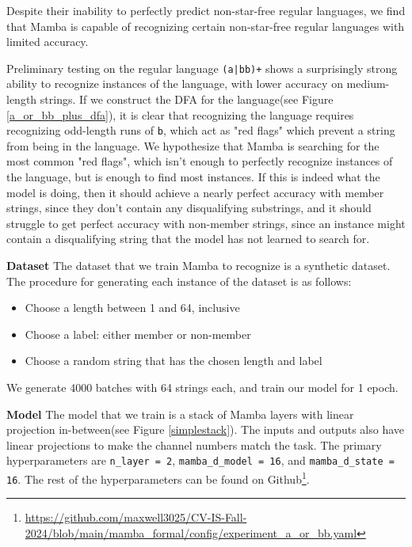 Despite their inability to perfectly predict non-star-free regular languages,
we find that Mamba is capable of recognizing certain non-star-free regular
languages with limited accuracy.

Preliminary testing on the regular language \texttt{(a|bb)+} shows a
surprisingly strong ability to recognize instances of the language, with lower
accuracy on medium-length strings.
If we construct the DFA for the language(see Figure \ref{a_or_bb_plus_dfa}), it
is clear that recognizing the language requires recognizing odd-length runs of
\verb|b|, which act as "red flags" which prevent a string from being in the
language.
We hypothesize that Mamba is searching for the most common "red flags", which
isn't enough to perfectly recognize instances of the language, but is enough
to find most instances.
If this is indeed what the model is doing, then it should achieve a nearly
perfect accuracy with member strings, since they don't contain any disqualifying
substrings, and it should struggle to get perfect accuracy with non-member
strings, since an instance might contain a disqualifying string that the model
has not learned to search for.

\textbf{Dataset} The dataset that we train Mamba to recognize is a synthetic
dataset.
The procedure for generating each instance of the dataset is as follows:
\begin{itemize}
    \item Choose a length between 1 and 64, inclusive
    \item Choose a label: either member or non-member
    \item Choose a random string that has the chosen length and label
\end{itemize}
We generate 4000 batches with 64 strings each, and train our model for 1 epoch.

\textbf{Model} The model that we train is a stack of Mamba layers with linear
projection in-between(see Figure \ref{simplestack}).
The inputs and outputs also have linear projections to make the channel numbers
match the task.
The primary hyperparameters are \verb|n_layer = 2|, \verb|mamba_d_model = 16|,
and \verb|mamba_d_state = 16|.
The rest of the hyperparameters can be found on
Github\footnote{\url{https://github.com/maxwell3025/CV-IS-Fall-2024/blob/main/mamba_formal/config/experiment_a_or_bb.yaml}}.

